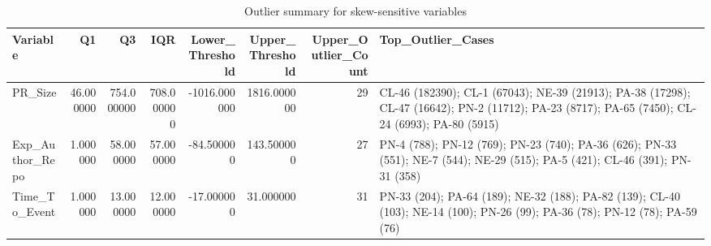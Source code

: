 \begin{table}
\caption{Outlier summary for skew-sensitive variables}
\label{tab:appendix-b-outliers}
\begin{tabular}{lrrrrrrl}
\toprule
Variable & Q1 & Q3 & IQR & Lower_Threshold & Upper_Threshold & Upper_Outlier_Count & Top_Outlier_Cases \\
\midrule
PR_Size & 46.000000 & 754.000000 & 708.000000 & -1016.000000 & 1816.000000 & 29 & CL-46 (182390); CL-1 (67043); NE-39 (21913); PA-38 (17298); CL-47 (16642); PN-2 (11712); PA-23 (8717); PA-65 (7450); CL-24 (6993); PA-80 (5915) \\
Exp_Author_Repo & 1.000000 & 58.000000 & 57.000000 & -84.500000 & 143.500000 & 27 & PN-4 (788); PN-12 (769); PN-23 (740); PA-36 (626); PN-33 (551); NE-7 (544); NE-29 (515); PA-5 (421); CL-46 (391); PN-31 (358) \\
Time_To_Event & 1.000000 & 13.000000 & 12.000000 & -17.000000 & 31.000000 & 31 & PN-33 (204); PA-64 (189); NE-32 (188); PA-82 (139); CL-40 (103); NE-14 (100); PN-26 (99); PA-36 (78); PN-12 (78); PA-59 (76) \\
\bottomrule
\end{tabular}
\end{table}
